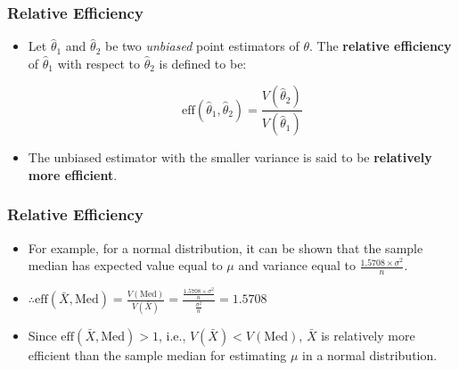 \documentclass[12pt]{beamer}
\begin{document}
\begin{frame}
	\frametitle{Relative Efficiency}
	
	\begin{itemize}[label={\color{blue}$\blacktriangleright$}]
		\item Let $\hat{\theta}_1$ and $\hat{\theta}_2$ be two \emph{unbiased} point estimators of $\theta$. The \textbf{relative efficiency} of $\hat{\theta}_1$ with respect to $\hat{\theta}_2$ is defined to be:
		
		\[
		\text{eff}(\hat{\theta}_1, \hat{\theta}_2) = \frac{V(\hat{\theta}_2)}{V(\hat{\theta}_1)}
		\]
		
		\item The unbiased estimator with the smaller variance is said to be \textbf{relatively more efficient}.
	\end{itemize}
	
\end{frame}
\begin{frame}
	\frametitle{Relative Efficiency}
	
	\begin{itemize}[label={\color{blue}$\blacktriangleright$}]
		\item For example, for a normal distribution, it can be shown that the sample median has expected value equal to $\mu$ and variance equal to $\frac{1.5708 \times \sigma^2}{n}$.
		
		\item[] $\therefore \text{eff}(\bar{X}, \text{Med}) = \frac{V(\text{Med})}{V(\bar{X})} = \frac{\frac{1.5708 \times \sigma^2}{n}}{\frac{\sigma^2}{n}} = 1.5708$
		
		\item Since $\text{eff}(\bar{X}, \text{Med}) > 1$, i.e., $V(\bar{X}) < V(\text{Med})$, $\bar{X}$ is relatively more efficient than the sample median for estimating $\mu$ in a normal distribution.
	\end{itemize}
	
\end{frame}
\end{document}
